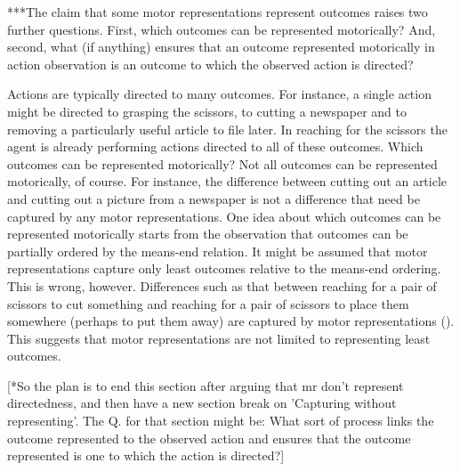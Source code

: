 \documentclass[12pt,\papersize]{extarticle}
\begin{document}
***The claim that some motor representations represent outcomes raises two further questions.  First, which outcomes can be represented motorically?  And, second, what (if anything) ensures that an outcome represented motorically in action observation is an outcome to which the observed action is directed?

Actions are typically directed to many outcomes.  For instance, a single action might be directed to grasping the scissors, to cutting a newspaper and to removing a particularly useful article to file later.  In reaching for the scissors the agent is already performing actions directed to all of these outcomes.  Which outcomes can be represented motorically?  Not all outcomes can be represented motorically, of course.  For instance, the difference between cutting out an article and cutting out a picture from a newspaper is not a difference that need be captured by any motor representations.  One idea about which outcomes can be represented motorically starts from the observation that outcomes can be partially ordered by the means-end relation. It might be assumed that motor representations capture only least outcomes relative to the means-end ordering.  This is wrong, however.  Differences such as that between reaching for a pair of scissors to cut something and reaching for a pair of scissors to place them somewhere (perhaps to put them away) are captured by motor representations (\citealp{Fogassi:2005nf, cattaneo:2007_impairment, bonini:2010_ventral}). This suggests that motor representations are not limited to representing least outcomes.  


  
[*So the plan is to end this section after arguing that mr don't represent directedness, and then have a new section break on 'Capturing without representing'.  The Q. for that section might be: What sort of process links the outcome represented to the observed action and ensures that the outcome represented is one to which the action is directed?]
\end{document}
